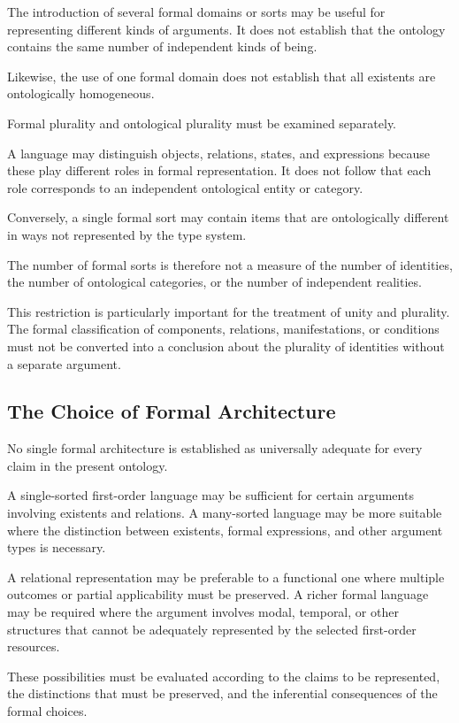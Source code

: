 The introduction
of several formal
domains or sorts
may be useful
for representing
different kinds
of arguments.
It does not
establish that
the ontology
contains the
same number
of independent
kinds of being.

Likewise, the
use of one
formal domain
does not
establish that
all existents
are ontologically
homogeneous.

Formal plurality
and ontological
plurality must
be examined
separately.

A language
may distinguish
objects, relations,
states, and
expressions because
these play
different roles
in formal
representation.
It does
not follow
that each
role corresponds
to an independent
ontological
entity or
category.

Conversely,
a single
formal sort
may contain
items that
are ontologically
different in
ways not
represented by
the type system.

The number
of formal
sorts is
therefore not
a measure
of the number
of identities,
the number
of ontological
categories,
or the
number of
independent
realities.

This restriction
is particularly
important for
the treatment
of unity
and plurality.
The formal
classification
of components,
relations,
manifestations,
or conditions
must not
be converted
into a conclusion
about the
plurality of
identities without
a separate
argument.

\subsection{The Choice of Formal Architecture}

No single
formal architecture
is established
as universally
adequate for
every claim
in the present
ontology.

A single-sorted
first-order language
may be sufficient
for certain
arguments involving
existents and
relations. A
many-sorted language
may be more
suitable where
the distinction
between existents,
formal expressions,
and other
argument types
is necessary.

A relational
representation
may be preferable
to a functional
one where
multiple outcomes
or partial
applicability must
be preserved.
A richer
formal language
may be required
where the
argument involves
modal, temporal,
or other
structures that
cannot be
adequately represented
by the selected
first-order resources.

These possibilities
must be evaluated
according to
the claims
to be represented,
the distinctions
that must be
preserved, and
the inferential
consequences of
the formal
choices.

